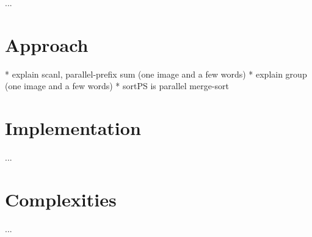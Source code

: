 

  ...
  
  \section{Approach}
    * explain scanl, parallel-prefix sum (one image and a few words)
    * explain group (one image and a few words)
    * sortPS is parallel merge-sort
  \section{Implementation}
    ...
  \section{Complexities}
    ...
    
        
      
    
